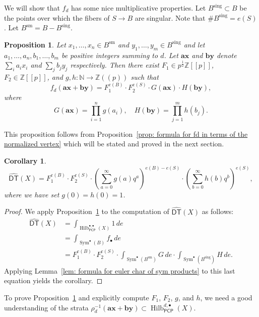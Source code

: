 \documentclass[12pt]{amsart}
\newtheorem{proposition}[theorem]{Proposition}
\newtheorem{corollary}[theorem]{Corollary}
\theoremstyle{definition}
\newcommand{\NN} {\mathbb{N}}		%
\newcommand{\ZZ} {\mathbb{Z}}		%
\newcommand{\Sym}{\operatorname{Sym}}
\newcommand{\Hilb}{\operatorname{Hilb}}
\newcommand{\DT}{\mathsf{DT}}
\newcommand{\sm}{\operatorname{sm}}
\newcommand{\sing}{\operatorname{sing}}
\newcommand{\boldx}{\boldsymbol{x}}
\newcommand{\boldy}{\boldsymbol{y}}
\newcommand{\bolda}{\boldsymbol{a}}
\newcommand{\boldb}{\boldsymbol{b}}
\newcommand{\DThat}{\widehat{\DT}}
\newcommand{\PCP}{\mathsf{PCP}}
\begin{document}
We will show that $f_{d}$ has some nice multiplicative properties. Let
$B^{\sing}\subset B$ be the points over which the fibers of $S\to B$
are singular. Note that $\# B^{\sing}=e(S)$. Let
$B^{\sm}=B-B^{\sing}$.

\begin{proposition}\label{prop: fd = F1*F2*G*H}
Let $x_{1},\dotsc ,x_{n}\in B^{\sm}$ and $y_{1},\dotsc ,y_{m}\in
B^{\sing}$ and let $a_{1},\dotsc ,a_{n},b_{1},\dotsc ,b_{m}$ be
positive integers summing to $d$. Let $\bolda \boldx$ and $\boldb
\boldy$ denote $\sum_{i}a_{i}x_{i}$ and $\sum_{j}b_{j}y_{j}$
respectively. Then there exist $F_{1} \in p^{\frac{1}{2}} \ZZ [[p]]$, $F_{2}\in \ZZ [[p]]$, and
$g,h:\NN \to \ZZ (\!(p)\!)$ such that
\[
f_{d}(\bolda \boldx +\boldb \boldy ) = F_{1}^{e(B)}\cdot
F_{2}^{e(S)}\cdot G(\bolda \boldx )\cdot H(\boldb \boldy ),
\]
where
\[
G(\bolda \boldx ) = \prod_{i=1}^{n}g(a_{i}), \quad H(\boldb \boldy ) =
\prod_{j=1}^{m}h(b_{j}).
\]
\end{proposition}
This proposition follows from Proposition~\ref{prop: formula for fd in
terms of the normalized vertex} which will be stated and proved in the
next section.


\begin{corollary}\label{cor: DThat = F1^{e(B)}F2^{e(S)}(sum g q^{a})^{e(B)-e(S)}...}
\[
\DThat (X) = F_{1}^{e(B)}\cdot F_{2}^{e(S)}\cdot
\left(\sum_{a=0}^{\infty}g(a) q^{a} \right)^{e(B)-e(S)}\cdot
\left(\sum_{b=0}^{\infty}h(b) q^{b} \right)^{e(S)},
\]
where we have set $g(0)=h(0)=1$.
\end{corollary}
\begin{proof}
We apply Proposition~\ref{prop: fd = F1*F2*G*H} to the computation of
$\DThat (X)$ as follows:
\begin{align*}
\DThat (X)&= \int_{\Hilb^{\bullet ,\bullet}_{\PCP}(X)} 1\, de\\
&=\int_{\Sym^{\bullet}(B)}f_{\bullet } \, de \\
&= F_{1}^{e(B)}\cdot F_{2}^{e(S)}\cdot  \int_{\Sym^{\bullet}(B^{\sm})}
G\,de \cdot  \int_{\Sym^{\bullet}(B^{\sing})}
H\,de .
\end{align*}
Applying Lemma~\ref{lem: formula for euler char of sym products} to
this last equation yields the corollary. 
\end{proof}


To prove Proposition~\ref{prop: fd = F1*F2*G*H} and explicitly
compute $F_{1}$, $F_{2}$, $g$, and $h$, we need a good understanding
of the strata $\rho_{d}^{-1} (\bolda \boldx +\boldb \boldy )\subset
\Hilb^{d,\bullet}_{\PCP}(X)$.
\end{document}
